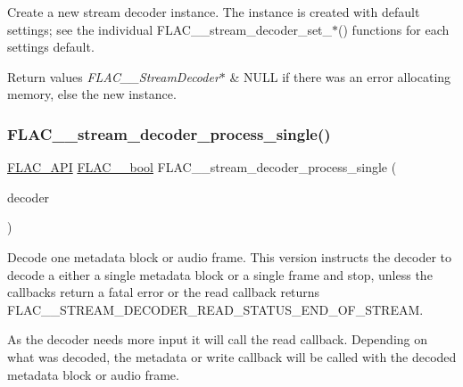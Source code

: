 Create a new stream decoder instance. The instance is created with default settings; see the individual F\+L\+A\+C\+\_\+\+\_\+stream\+\_\+decoder\+\_\+set\+\_\+$\ast$() functions for each setting\textquotesingle{}s default.


\begin{DoxyRetVals}{Return values}
{\em F\+L\+A\+C\+\_\+\+\_\+\+Stream\+Decoder$\ast$} & {\ttfamily N\+U\+LL} if there was an error allocating memory, else the new instance. \\
\hline
\end{DoxyRetVals}
\mbox{\label{group__flac__stream__decoder_ga8c4708eb2c5d99595f64dc2473aa2f42}} 
\subsubsection{\texorpdfstring{FLAC\_\_stream\_decoder\_process\_single()}{FLAC\_\_stream\_decoder\_process\_single()}}
{\footnotesize\ttfamily \mbox{\hyperlink{group__flac__export_ga56ca07df8a23310707732b1c0007d6f5}{F\+L\+A\+C\+\_\+\+A\+PI}} \mbox{\hyperlink{ordinals_8h_a95103469f1cbd78b8cf250194985b34e}{F\+L\+A\+C\+\_\+\+\_\+bool}} F\+L\+A\+C\+\_\+\+\_\+stream\+\_\+decoder\+\_\+process\+\_\+single (\begin{DoxyParamCaption}\item[{\mbox{\hyperlink{struct_f_l_a_c_____stream_decoder}{F\+L\+A\+C\+\_\+\+\_\+\+Stream\+Decoder}} $\ast$}]{decoder }\end{DoxyParamCaption})}

Decode one metadata block or audio frame. This version instructs the decoder to decode a either a single metadata block or a single frame and stop, unless the callbacks return a fatal error or the read callback returns {\ttfamily F\+L\+A\+C\+\_\+\+\_\+\+S\+T\+R\+E\+A\+M\+\_\+\+D\+E\+C\+O\+D\+E\+R\+\_\+\+R\+E\+A\+D\+\_\+\+S\+T\+A\+T\+U\+S\+\_\+\+E\+N\+D\+\_\+\+O\+F\+\_\+\+S\+T\+R\+E\+AM}.

As the decoder needs more input it will call the read callback. Depending on what was decoded, the metadata or write callback will be called with the decoded metadata block or audio frame.

